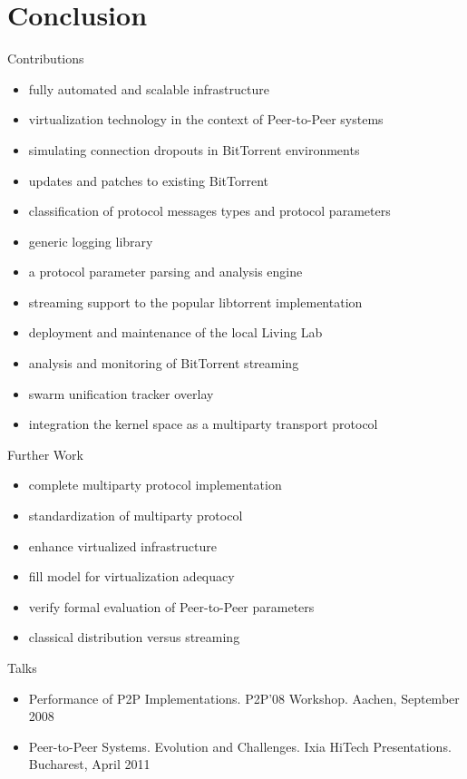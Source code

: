 \documentclass{beamer}
\begin{document}
\section{Conclusion}

\begin{frame}{Contributions}
  \begin{itemize}
    \item fully automated and scalable infrastructure
    \item virtualization technology in the context of Peer-to-Peer systems
    \item simulating connection dropouts in BitTorrent environments
    \item updates and patches to existing BitTorrent
    \item classification of protocol messages types and protocol parameters
    \item generic logging library
    \item a protocol parameter parsing and analysis engine
    \item streaming support to the popular libtorrent implementation
    \item deployment and maintenance of the local Living Lab
    \item analysis and monitoring of BitTorrent streaming
    \item swarm unification tracker overlay
    \item integration the kernel space as a multiparty transport protocol
  \end{itemize}
\end{frame}

\begin{frame}{Further Work}
  \begin{itemize}
    \item complete multiparty protocol implementation
    \item standardization of multiparty protocol
    \item enhance virtualized infrastructure
    \item fill model for virtualization adequacy
    \item verify formal evaluation of Peer-to-Peer parameters
    \item classical distribution versus streaming
  \end{itemize}
\end{frame}

\begin{frame}{Talks}
  \begin{itemize}
    \item Performance of P2P Implementations. P2P'08 Workshop. Aachen, September
    2008
    \item Peer-to-Peer Systems. Evolution and Challenges. Ixia HiTech
    Presentations. Bucharest, April 2011
  \end{itemize}
\end{frame}
\end{document}
